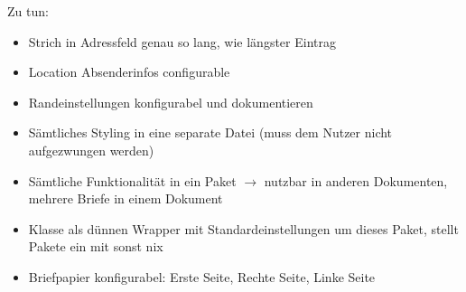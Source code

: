 \documentclass[twoside]{brbrief}
\begin{document}
	\maketitle{}
	
	\lipsum[1-2]
	
	Zu tun:
	\begin{itemize}
		\item Strich in Adressfeld genau so lang, wie längster Eintrag
		\item Location Absenderinfos configurable
		\item Randeinstellungen konfigurabel und dokumentieren
		\item Sämtliches Styling in eine separate Datei (muss dem Nutzer nicht aufgezwungen werden)
		\item Sämtliche Funktionalität in ein Paket $\to$ nutzbar in anderen Dokumenten, mehrere Briefe in einem Dokument
		\item Klasse als dünnen Wrapper mit Standardeinstellungen um dieses Paket, stellt Pakete ein mit sonst nix
		\item Briefpapier konfigurabel: Erste Seite, Rechte Seite, Linke Seite
	\end{itemize}
	
	
	
\end{document}

